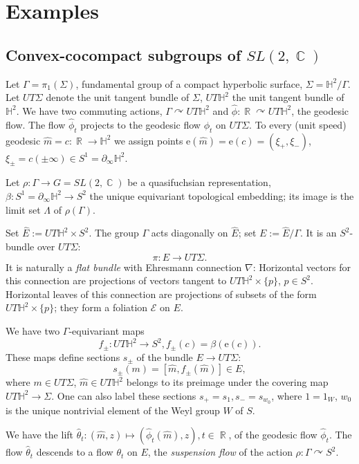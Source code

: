 \documentclass[12pt]{amsbook}%
\theoremstyle{definition}
\theoremstyle{remark}
\numberwithin{section}{chapter}
\numberwithin{subsection}{section}
\numberwithin{figure}{chapter}
\DeclareMathOperator{\C}{\mathbb{C}}
\DeclareMathOperator{\acts}{\curvearrowright}
\DeclareMathOperator{\R}{\mathbb{R}}
\def\bH{{\mathbb{H}}}
\def\cE{{\mathscr{E}}}
\def\re{\mathrm{e}}
\def\Ga{\Gamma}
\def\La{\Lambda}
\def\geo{\partial_\infty}
\begin{document}
{{\section{Examples}

\subsection{Convex-cocompact subgroups of $SL(2,\C)$}

Let $\Ga=\pi_1(\Sigma)$, fundamental group of a compact hyperbolic surface, $\Sigma=\bH^2/\Ga$. Let $UT\Sigma$ denote the unit tangent bundle of $\Sigma$, $UT\bH^2$ the unit tangent bundle of $\bH^2$. We have two commuting actions, $\Ga\acts UT\bH^2$ and 
$\hat\phi: \R\acts UT\bH^2$, the geodesic flow. 
The flow $\hat\phi_t$ projects to the geodesic flow $\phi_t$ on $UT\Sigma$.  
To every (unit speed) geodesic $\hat m=c: \R\to \bH^2$ we assign points $\re(\hat m)=\re(c)=(\xi_+, \xi_-)$, $\xi_\pm=c(\pm \infty)\in S^1=\geo \bH^2$. 

Let $\rho: \Ga\to G=SL(2,\C)$ be a quasifuchsian representation, $\beta: S^1=\geo \bH^2\to S^2$ the unique equivariant topological embedding; its image is the limit set $\La$ of $\rho(\Ga)$. 

Set $\widehat E:= UT\bH^2\times S^2$. The group $\Ga$ acts diagonally on $\widehat E$; set $E:= \widehat E/\Ga$. It is an $S^2$-bundle over $UT\Sigma$:
$$
\pi: E\to UT\Sigma. 
$$ 
It is naturally a {\em flat bundle} with Ehresmann connection $\nabla$: Horizontal vectors for this connection are projections of vectors tangent to $UT\bH^2\times \{p\}$, $p\in S^2$. Horizontal leaves of this connection are projections of subsets of the form 
$UT\bH^2\times \{p\}$; they form a foliation $\cE$ on $E$. 

We have two $\Ga$-equivariant maps  
$$
f_\pm: UT\bH^2\to S^2, f_\pm(c)= \beta(\re(c)). 
$$
These maps define sections $s_\pm$ of the bundle $E\to UT\Sigma$: 
$$
s_\pm(m)= [\hat m, f_\pm(\hat m)]\in E, 
$$
where $m\in UT\Sigma$, $\hat m\in UT\bH^2$ belongs to its preimage under the covering map $UT\bH^2\to \Sigma$.  
One can also label these sections $s_+=s_{1}, s_-=s_{w_0}$, where $1=1_W$, $w_0$ is the unique nontrivial element of the Weyl group $W$ of $S$. 

We have the lift $\hat\theta_t: (\hat m, z)\mapsto (\hat\phi_t(\hat m), z), t\in \R$, of the geodesic flow $\hat\phi_t$. The flow 
$\hat\theta_t$ descends to a flow $\theta_t$ on $E$, the {\em suspension flow} of the action $\rho: \Ga\acts S^2$. 

}}
\end{document}
